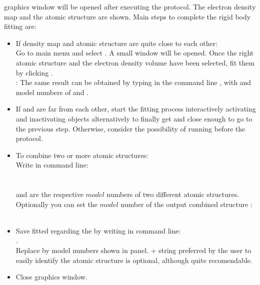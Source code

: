 \begin{itemize}
  \chimera graphics window will be opened after executing the protocol. The electron density map and the atomic structure are shown. Main steps to complete the rigid body fitting are:
  \begin{itemize}
   \item If density map and atomic structure are quite close to each other:\\Go to \chimera main menu and select . A small  window will be opened. Once the right atomic structure and the electron density volume have been selected, fit them by clicking .\\
   : The same result can be obtained by typing in the command line , with  and  \chimera model numbers of  and .
   \item If  and  are far from each other, start the fitting process interactively activating and inactivating \chimera objects alternatively to finally get  and  close enough to go to the previous step. Otherwise, consider the possibility of running before the \phenix {} protocol.
   \item To combine two or more atomic structures:\\
                            Write in \chimera command line:\\
                            \\
                            \\
                             and  are the respective $model$ numbers of two different atomic structures. Optionally you can set the $model$ number of the output combined structure :\\
                            \\
   \item Save fitted  regarding the  by writing in \chimera command line:\\ .\\Replace {} by model numbers shown in \chimera {} panel.  + string preferred by the user to easily identify the atomic structure is optional, although quite recomendable.
   \item Close \chimera graphics window.
  \end{itemize}
  

\end{itemize}

